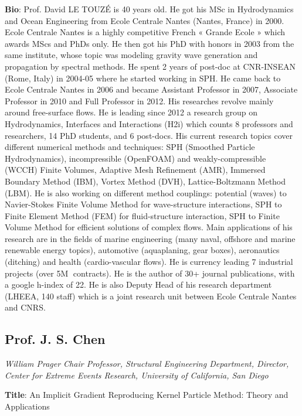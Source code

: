\textbf{Bio}: Prof. David LE TOUZÉ is 40 years old. He got his MSc in Hydrodynamics and Ocean Engineering from Ecole Centrale Nantes (Nantes, France) in 2000. Ecole Centrale Nantes is a highly competitive French « Grande Ecole » which awards MScs and PhDs only. He then got his PhD with honors in 2003 from the same institute, whose topic was modeling gravity wave generation and propagation by spectral methods. He spent 2 years of post-doc at CNR-INSEAN (Rome, Italy) in 2004-05 where he started working in SPH. He came back to Ecole Centrale Nantes in 2006 and became Assistant Professor in 2007, Associate Professor in 2010 and Full Professor in 2012. His researches revolve mainly around free-surface flows. He is leading since 2012 a research group on Hydrodynamics, Interfaces and Interactions (H2i) which counts 8 professors and researchers, 14 PhD students, and 6 post-docs. His current research topics cover different numerical methods and techniques: SPH (Smoothed Particle Hydrodynamics), incompressible (OpenFOAM) and weakly-compressible (WCCH) Finite Volumes, Adaptive Mesh Refinement (AMR), Immersed Boundary Method (IBM), Vortex Method (DVH), Lattice-Boltzmann Method (LBM). He is also working on different method couplings: potential (waves) to Navier-Stokes Finite Volume Method for wave-structure interactions, SPH to Finite Element Method (FEM) for fluid-structure interaction, SPH to Finite Volume Method for efficient solutions of complex flows. Main applications of his research are in the fields of marine engineering (many naval, offshore and marine renewable energy topics), automotive (aquaplaning, gear boxes), aeronautics (ditching) and health (cardio-vascular flows). He is currency leading 7 industrial projects (over 5M contracts). He is the author of 30+ journal publications, with a google h-index of 22. He is also Deputy Head of his research department (LHEEA, 140 staff) which is a joint research unit between Ecole Centrale Nantes and CNRS.

\subsection*{Prof.  J. S. Chen}\label{Chen}
\textit{William Prager Chair Professor, Structural Engineering Department, Director, Center for Extreme Events Research, University of California, San Diego}

\textbf{Title}: An Implicit Gradient Reproducing Kernel Particle Method: Theory and Applications

